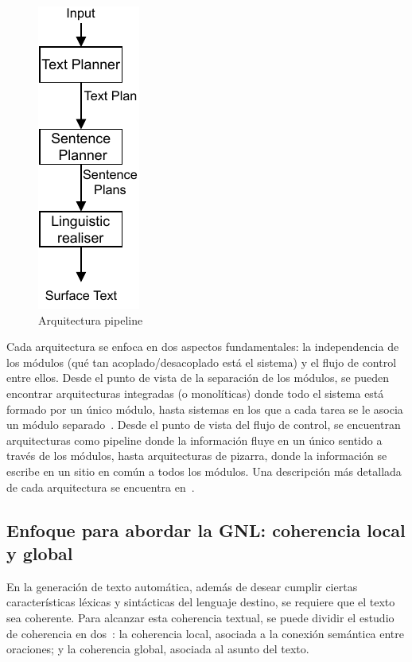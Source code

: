 \begin{figure}
    \centering
    \includegraphics[]{img/antecedentes/pipeline.pdf}
    \caption{Arquitectura pipeline}
    \label{fig:arq_pipeline}
\end{figure}
 

Cada arquitectura se enfoca en dos aspectos fundamentales: la independencia de los módulos (qué tan acoplado/desacoplado está el sistema) y el flujo de control entre ellos. Desde el punto de vista de la separación de los módulos, se pueden encontrar arquitecturas integradas (o monolíticas) donde todo el sistema está formado por un único módulo, hasta sistemas en los que a cada tarea se le asocia un módulo separado~\cite{hervas2008descripcion}. Desde el punto de vista del flujo de control, se encuentran arquitecturas como pipeline donde la información fluye en un único sentido a través de los módulos, hasta arquitecturas de pizarra, donde la información se escribe en un sitio en común a todos los módulos.
Una descripción más detallada de cada arquitectura se encuentra  en~\cite{ibanez2004arquitectura}.

\subsection{Enfoque para abordar la GNL: coherencia local y global}
En la generación de texto automática, además de desear cumplir ciertas características léxicas y sintácticas del lenguaje destino, se requiere que el texto sea coherente. Para alcanzar esta coherencia textual, se puede dividir el estudio de coherencia en dos~\cite{van2005estructuras}: la coherencia local, asociada a la conexión semántica entre oraciones; y la coherencia global, asociada al asunto del texto.

